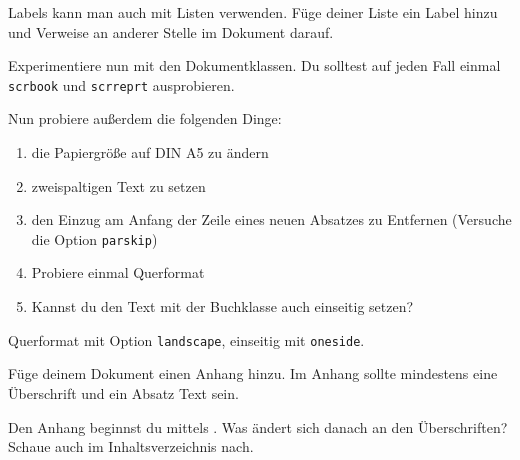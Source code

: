 \begin{uebung}
\item Labels kann man auch mit Listen verwenden. Füge deiner Liste ein Label
    hinzu und Verweise an anderer Stelle im Dokument darauf.

\item Experimentiere nun mit den Dokumentklassen. Du solltest auf jeden
    Fall einmal \texttt{scrbook} und \texttt{scrreprt} ausprobieren.
    
    Nun probiere außerdem die folgenden Dinge:
    \begin{enumerate}
        \item die Papiergröße auf DIN A5 zu ändern
        \item zweispaltigen Text zu setzen
        \item den Einzug am Anfang der Zeile eines neuen Absatzes zu
            Entfernen (Versuche die Option \texttt{parskip})
        \item Probiere einmal Querformat
        \item Kannst du den Text mit der Buchklasse auch einseitig setzen?
    \end{enumerate}
    \begin{loesung}
        Querformat mit Option \texttt{landscape}, einseitig mit \texttt{oneside}.
    \end{loesung}

\item Füge deinem Dokument einen Anhang hinzu. Im Anhang sollte mindestens
    eine Überschrift und ein Absatz Text sein.
    \begin{hinweis}
        Den Anhang beginnst du mittels . Was ändert sich
        danach an den Überschriften? Schaue auch im Inhaltsverzeichnis nach.
    \end{hinweis}\label{markup:last}

\end{uebung}